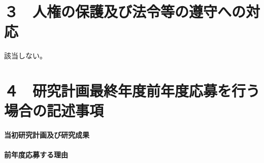 \documentclass[11pt,a4j,dvipdfmx]{jarticle} 					%
\newcommand{\研究課題名}{誤り耐性量子コンピュータに向けた誤り訂正技術の開発(仮)}
\newcommand{\研究機関名}{東京大学}
\newcommand{\研究代表者氏名}{寺師弘二}
\newcommand{\研究期間の最終元号年度}{10}  %
\begin{document}



\section{３　人権の保護及び法令等の遵守への対応}

該当しない。




\section{４　研究計画最終年度前年度応募を行う場合の記述事項}

\newcommand{\最終年度研究種目名}{}
\newcommand{\最終年度研究課題番号}{}
\newcommand{\最終年度研究課題名}{}
\newcommand{\最終年度研究期間}{}


\noindent
\textbf{当初研究計画及び研究成果}\\
\\

\noindent
\textbf{前年度応募する理由}\\



\end{document}
